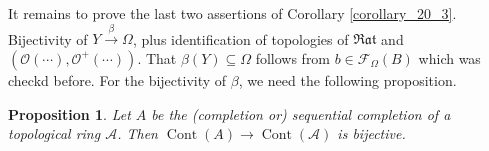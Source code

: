 \documentclass[8pt]{article}
\numberwithin{equation}{section}
\newtheorem{proposition}{Proposition}[subsection]
\DeclareMathOperator{\Cont}{Cont}
\newcommand{\Ouv}{\mathscr{O}}
\newcommand{\N}[0]{\mathbb{N}}
\newcommand{\Rat}[0]{\mathfrak{Rat}}
\begin{document}
\par It remains to prove the last two assertions of Corollary \ref{corollary_20_3}. Bijectivity of $Y\stackrel{\beta}{\to}\Omega$, plus identification of topologies of $\Rat$ and $(\Ouv(\cdots),\Ouv^+(\cdots))$. That $\beta(Y)\subseteq\Omega$ follows from $b\in\mathcal{F}_\Omega(B)$ which was checkd before. For the bijectivity of $\beta$, we need the following proposition.
\begin{proposition}
    \label{proposition_21_4}
    Let $A$ be the (completion or) sequential completion of a topological ring $\mathcal{A}$. Then $\Cont(A)\to \Cont(\mathcal{A})$ is bijective.
\end{proposition}
\end{document}
